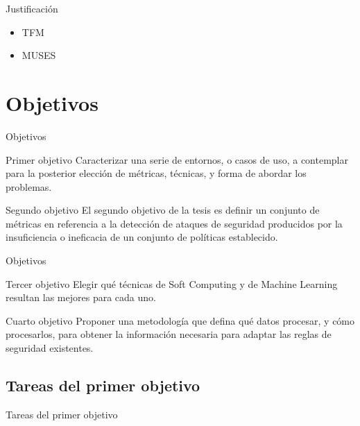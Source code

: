 \documentclass{beamer}
\begin{document}
\begin{frame}{Justificación}

\begin{itemize}
  \item TFM
  \item MUSES
\end{itemize}

\end{frame}


\section{Objetivos}

\begin{frame}{Objetivos}

\begin{block}{Primer objetivo}
Caracterizar una serie de entornos, o casos de uso, a contemplar para la posterior elección de métricas, técnicas, y forma de abordar los problemas.
\end{block}

\begin{block}{Segundo objetivo}
El segundo objetivo de la tesis es definir un conjunto de métricas en referencia a la detección de ataques de seguridad producidos por la insuficiencia o ineficacia de un conjunto de políticas establecido.
\end{block}

\end{frame}

\begin{frame}{Objetivos}

\begin{block}{Tercer objetivo}
Elegir qué técnicas de Soft Computing y de Machine Learning resultan las mejores para cada uno.
\end{block}

\begin{block}{Cuarto objetivo}
Proponer una metodología que defina qué datos procesar, y cómo procesarlos, para obtener la información necesaria para adaptar las reglas de seguridad existentes.
\end{block}

\end{frame}

\subsection{Tareas del primer objetivo}

\begin{frame}{Tareas del primer objetivo}

\end{frame}
\end{document}
